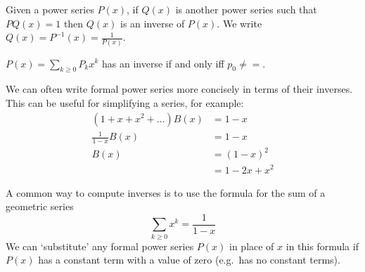 \documentclass[12pt]{article}
\begin{document}
Given a power series $P(x)$, if $Q(x)$ is another power series such that $PQ(x) = 1$ then $Q(x)$ is an inverse of $P(x)$. We write $Q(x) = P^{-1}(x) = \frac{1}{P(x)}$.

\begin{lemma}
$P(x) = \displaystyle\sum_{k \geq 0} P_k x^k$ has an inverse if and only iff $p_0 \neq =$.
\end{lemma}

We can often write formal power series more concisely in terms of their inverses. This can be useful for simplifying a series, for example:
\begin{align*}
(1 + x + x^2 + \dots) B(x) &= 1-x\\
\frac{1}{1-x} B(x) &= 1 - x\\
B(x) &= {(1-x)}^2\\
&= 1 -2x  + x^2
\end{align*}

A common way to compute inverses is to use the formula for the sum of a geometric series \[ \sum_{k\geq 0} x^k = \frac{1}{1-x} \] We can `substitute' any formal power series $P(x)$ in place of $x$ in this formula if $P(x)$ has a constant term with a value of zero (e.g.\ has no constant terms).
\end{document}
